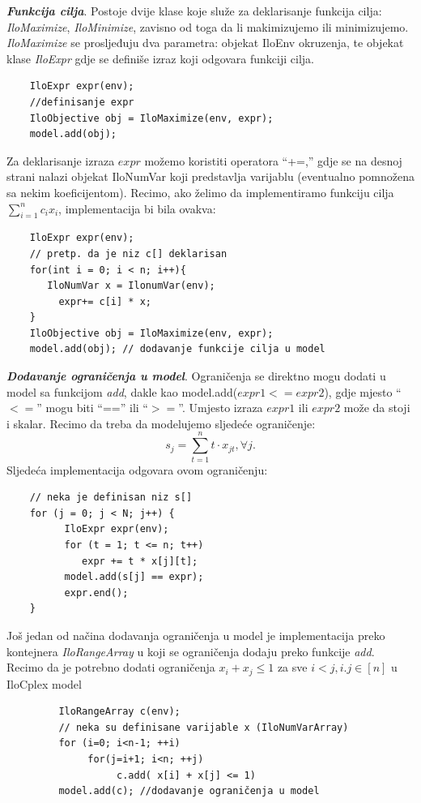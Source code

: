 \documentclass[a4paper, utf8, 11pt, colorlinks]{book}
\begin{document}
 \noindent \textbf{\emph{Funkcija cilja}}. 
 Postoje dvije klase koje služe za deklarisanje funkcija cilja: \emph{IloMaximize}, \emph{IloMinimize}, zavisno od toga da li makimizujemo ili minimizujemo. \emph{IloMaximize} se prosljeđuju dva parametra: objekat IloEnv okruzenja, te objekat klase \emph{IloExpr} gdje se definiše  izraz koji odgovara funkciji cilja. 
 
 \begin{verbatim}
 	IloExpr expr(env);
 	//definisanje expr
 	IloObjective obj = IloMaximize(env, expr);
 	model.add(obj);
 \end{verbatim}
 
 \noindent Za deklarisanje izraza $expr$ možemo koristiti operatora ``+=,'' gdje se na desnoj strani nalazi objekat IloNumVar koji predstavlja varijablu (eventualno pomnožena sa nekim koeficijentom). 
 Recimo, ako želimo da implementiramo funkciju cilja $\sum_{i=1}^n c_i x_i$, implementacija bi bila ovakva:
 
 \begin{verbatim}
 	IloExpr expr(env);
 	// pretp. da je niz c[] deklarisan
 	for(int i = 0; i < n; i++){
       IloNumVar x = IlonumVar(env);
 	     expr+= c[i] * x;
 	}
 	IloObjective obj = IloMaximize(env, expr);
 	model.add(obj); // dodavanje funkcije cilja u model
 \end{verbatim}
 
 \noindent \textbf{\emph{Dodavanje ograničenja u model}}. Ograničenja se direktno mogu dodati  u model sa funkcijom \emph{add}, dakle kao 
 model.add($expr1 <= expr2$), gdje mjesto ``$<=$'' mogu biti ``=='' ili ``$>=$''. Umjesto izraza $expr1$ ili $expr2$ može da stoji i skalar. Recimo da treba da modelujemo sljedeće ograničenje:
 $$s_j = \sum_{t=1}^n t \cdot x_{jt}, \forall j.$$ 
 Sljedeća implementacija odgovara ovom ograničenju: 
 \begin{verbatim}
 	// neka je definisan niz s[]
 	for (j = 0; j < N; j++) {
 		  IloExpr expr(env);
 		  for (t = 1; t <= n; t++)
 	  	     expr += t * x[j][t];            
 		  model.add(s[j] == expr);
 		  expr.end();
 	}
 \end{verbatim}
 Još jedan od načina dodavanja ograničenja u model je implementacija preko kontejnera \emph{IloRangeArray} u koji se ograničenja dodaju preko funkcije \emph{add}.   
 Recimo da je potrebno dodati ograničenja $x_i + x_j \leq 1$ za sve $i<j, i.j \in [n]$ u IloCplex model
 
 \begin{verbatim}
 	     IloRangeArray c(env);
 	     // neka su definisane varijable x (IloNumVarArray) 
 	     for (i=0; i<n-1; ++i)
 	          for(j=i+1; i<n; ++j)
 	               c.add( x[i] + x[j] <= 1)     
      	 model.add(c); //dodavanje ograničenja u model
 \end{verbatim}
 
\end{document}
